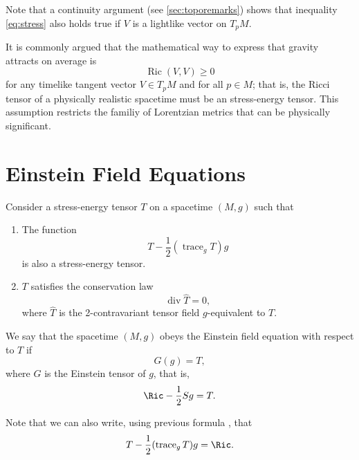 Note that a continuity argument (see \autoref{sec:toporemarks}) shows that inequality \ref{eq:stress} also holds true if $V$ is a lightlike vector on $T_p M$.

It is commonly argued that the mathematical way to express that gravity attracts on average is
\begin{equation}
	\operatorname{Ric} (V,V) \geq 0
\end{equation}
for any timelike tangent vector $V \in T_p M$ and for all $p \in M$; that is, the Ricci tensor of a physically realistic spacetime must be an stress-energy tensor. This assumption restricts the familiy of Lorentzian metrics that can be physically significant.

\section{Einstein Field Equations}

Consider a stress-energy tensor $T$ on a spacetime $(M,g)$ such that
\begin{enumerate}
	\item The function \begin{equation}
		\label{eq:stressderived}
		T - \frac{1}{2}(\operatorname{trace}_g T) g
	\end{equation} is also a stress-energy tensor.
	\item $T$ satisfies the conservation law \begin{equation}
		\label{eq:div0}
		\operatorname{div} \widehat{T} = 0,
	\end{equation}
	where $\widehat{T}$ is the 2-contravariant tensor field $g$-equivalent to $T$.
\end{enumerate}

We say that the spacetime $(M,g)$ obeys the Einstein field equation with respect to $T$ if
\begin{equation}
	\label{eq:einstein}
	G(g) = T,
\end{equation}
where $G$ is the Einstein tensor of $g$, that is,
\begin{equation}
	\label{eq:einstein2}
	\Ric - \frac{1}{2}Sg = T.
\end{equation}

Note that we can also write, using previous formula , that
\begin{equation}
	\label{eq:einstein3}
	T - \frac{1}{2}(\operatorname{trace}_g T)g = \Ric.
\end{equation}

